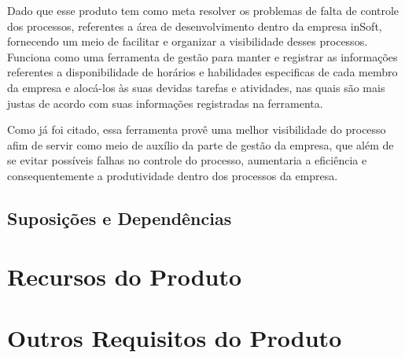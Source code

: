       Dado que esse produto tem como meta resolver os problemas de falta de controle dos processos, referentes a área de desenvolvimento dentro da empresa inSoft, fornecendo um meio de facilitar e organizar a visibilidade desses processos. Funciona como uma ferramenta de gestão para manter e registrar as informações referentes a disponibilidade de horários e habilidades especificas de cada membro da empresa e alocá-los às suas devidas tarefas e atividades, nas quais são mais justas de acordo com suas informações registradas na ferramenta.

      Como já foi citado, essa ferramenta provê uma melhor visibilidade do processo afim de servir como meio de auxílio da parte de gestão da empresa, que além de se evitar possíveis falhas no controle do processo, aumentaria a eficiência e consequentemente a produtividade dentro dos processos da empresa.

    \subsection{Suposições e Dependências}
  \section{Recursos do Produto}
  \section{Outros Requisitos do Produto}
